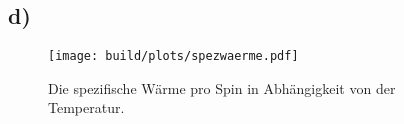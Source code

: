 \subsection*{d)}

\begin{figure}
  \texttt{[image: build/plots/spezwaerme.pdf]}
  \caption{Die spezifische Wärme pro Spin in Abhängigkeit von der Temperatur.}
  \label{}
\end{figure}









